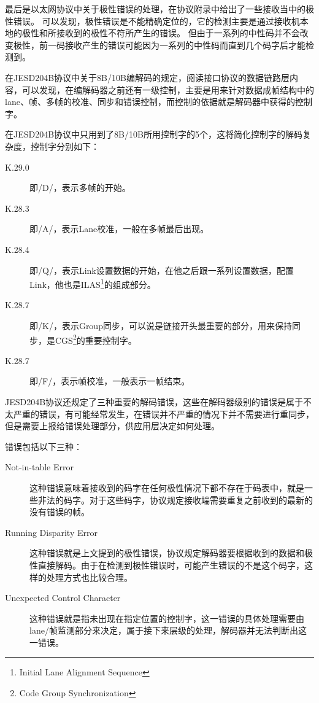 \documentclass[UTF8]{ctexart}
\begin{document}
最后是以太网协议中关于极性错误的处理，在协议附录中给出了一些接收当中的极性错误。
可以发现，极性错误是不能精确定位的，它的检测主要是通过接收机本地的极性和所接收到的极性不符所产生的错误。
但由于一系列的中性码并不会改变极性，前一码接收产生的错误可能因为一系列的中性码而直到几个码字后才能检测到。

在JESD204B协议中关于8B/10B编解码的规定，阅读接口协议的数据链路层内容，可以发现，在编解码器之前还有一级控制，主要是用来针对数据成帧结构中的lane、帧、多帧的校准、同步和错误控制，而控制的依据就是解码器中获得的控制字。

在JESD204B协议中只用到了8B/10B所用控制字的5个，这将简化控制字的解码复杂度，控制字分别如下：

\begin{description}
  \item[K.29.0] 即/D/，表示多帧的开始。
  \item[K.28.3] 即/A/，表示Lane校准，一般在多帧最后出现。
  \item[K.28.4] 即/Q/，表示Link设置数据的开始，在他之后跟一系列设置数据，配置Link，他也是ILAS\footnote{Initial Lane Alignment Sequence}的组成部分。
  \item[K.28.7] 即/K/，表示Group同步，可以说是链接开头最重要的部分，用来保持同步，是CGS\footnote{Code Group Synchronization}的重要控制字。
  \item[K.28.7] 即/F/，表示帧校准，一般表示一帧结束。
\end{description}

JESD204B协议还规定了三种重要的解码错误，这些在解码器级别的错误是属于不太严重的错误，有可能经常发生，在错误并不严重的情况下并不需要进行重同步，但是需要上报给错误处理部分，供应用层决定如何处理。

错误包括以下三种：

\begin{description}
  \item[Not-in-table Error] 这种错误意味着接收到的码字在任何极性情况下都不存在于码表中，就是一些非法的码字。对于这些码字，协议规定接收端需要重复之前收到的最新的没有错误的帧。
  \item[Running Disparity Error] 这种错误就是上文提到的极性错误，协议规定解码器要根据收到的数据和极性直接解码。由于在检测到极性错误时，可能产生错误的不是这个码字，这样的处理方式也比较合理。
  \item[Unexpected Control Character] 这种错误就是指未出现在指定位置的控制字，这一错误的具体处理需要由lane/帧监测部分来决定，属于接下来层级的处理，解码器并无法判断出这一错误。
\end{description}
\end{document}
